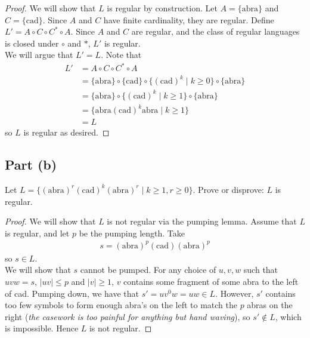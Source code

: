\documentclass{article}
\begin{document}
\begin{proof}
    We will show that $L$ is regular by construction. Let $A = \{ \text{abra} \}$ and $C = \{ \text{cad} \}$. Since $A$ and $C$ have finite cardinality, they 
    are regular. Define $L' = A \circ C \circ C^* \circ A$. Since $A$ and $C$ are regular, and the class of regular languages is closed under $\circ$ and $*$, 
    $L'$ is regular. \\
    
    \noindent
    We will argue that $L' = L$. Note that
    \begin{align*}
        L' &= A \circ C \circ C^* \circ A \\
        &= \{ \text{abra} \} \circ \{ \text{cad} \} \circ \{ (\text{cad})^k \mid k \geq 0 \} \circ \{ \text{abra} \} \\
        &= \{ \text{abra} \} \circ \{ (\text{cad})^k \mid k \geq 1 \} \circ \{ \text{abra} \} \\
        &=  \{ \text{abra} (\text{cad})^k \text{abra} \mid k \geq 1 \} \\
        &= L
    \end{align*} 
    so $L$ is regular as desired.
\end{proof}

\subsection*{Part (b)}

Let $L = \{ (\text{abra})^r (\text{cad})^k (\text{abra})^r \mid k \geq 1, r \geq 0 \}$. Prove or disprove: $L$ is regular.

\begin{proof}
    We will show that $L$ is not regular via the pumping lemma. Assume that $L$ is regular, and let $p$ be the pumping length. Take 
    \begin{align*}
        s = (\text{abra})^p (\text{cad}) (\text{abra})^p 
    \end{align*}
    so $s \in L$. \\

    \noindent
    We will show that $s$ cannot be pumped. For any choice of $u, v, w$ such that $uvw = s$, $|uv| \leq p$ and $|v| \geq 1$, $v$ contains some fragment of some 
    abra to the left of cad. Pumping down, we have that $s' = uv^0w = uw \in L$. However, $s'$ contains too few symbols to form enough abra's on the left
    to match the $p$ abras on the right (\textit{the casework is too painful for anything but hand waving}), so $s' \not \in L$, which is impossible. Hence $L$
    is not regular.
\end{proof}
\end{document}
